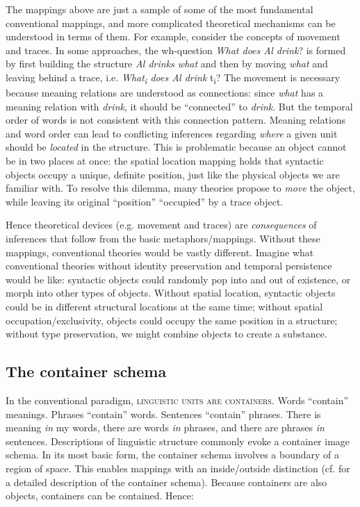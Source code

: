   The mappings above are just a sample of some of the most fundamental conventional mappings, and more complicated theoretical mechanisms can be understood in terms of them. For example, consider the concepts of movement and traces. In some approaches, the wh-question \textit{What does Al drink}? is formed by first building the structure \textit{Al drinks what} and then by moving \textit{what} and leaving behind a trace, i.e. \textit{What\textsubscript{i} does Al drink} t\textsubscript{i}? The movement is necessary because meaning relations are understood as connections: since \textit{what} has a meaning relation with \textit{drink}, it should be “connected” to \textit{drink}. But the temporal order of words is not consistent with this connection pattern. Meaning relations and word order can lead to conflicting inferences regarding \textit{where} a given unit should be \textit{located} in the structure. This is problematic because an object cannot be in two places at once: the spatial location mapping holds that syntactic objects occupy a unique, definite position, just like the physical objects we are familiar with. To resolve this dilemma, many theories propose to \textit{move} the object, while leaving its original “position” “occupied” by a trace object.

  Hence theoretical devices (e.g. movement and traces) are \textit{consequences} of inferences that follow from the basic metaphors/mappings. Without these mappings, conventional theories would be vastly different. Imagine what conventional theories without identity preservation and temporal persistence would be like: syntactic objects could randomly pop into and out of existence, or morph into other types of objects. Without spatial location, syntactic objects could be in different structural locations at the same time; without spatial occupation/exclusivity, objects could occupy the same position in a structure; without type preservation, we might combine objects to create a substance.

\subsection{The container schema} 

In the conventional paradigm, \textsc{linguistic units are containers}. Words “contain” meanings. Phrases “contain” words. Sentences “contain” phrases. There is meaning \textit{in} my words, there are words \textit{in} phrases, and there are phrases \textit{in} sentences. Descriptions of linguistic structure commonly evoke a container image schema. In its most basic form, the container schema involves a boundary of a region of space. This enables mappings with an inside/outside distinction (cf. \citet{LakoffNúñez2000} for a detailed description of the container schema). Because containers are also objects, containers can be contained. Hence:


